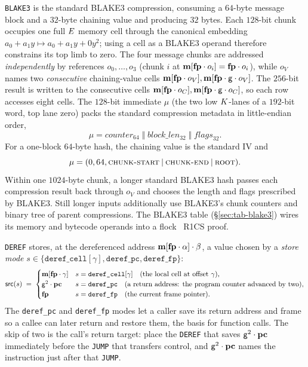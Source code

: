 \texttt{BLAKE3} is the standard BLAKE3 compression, consuming a $64$-byte message block and a $32$-byte chaining value and producing $32$ bytes. Each $128$-bit chunk occupies one full $E$ memory cell through the canonical embedding $a_0+a_1y\mapsto a_0+a_1y+0y^2$; using a cell as a BLAKE3 operand therefore constrains its top limb to zero. The four message chunks are addressed \emph{independently} by references $o_0,\dots,o_3$ (chunk $i$ at $\mathbf{m}[\mathbf{fp}\cdot o_i]=\mathbf{fp}\cdot o_i$), while $o_V$ names two \emph{consecutive} chaining-value cells $\mathbf{m}[\mathbf{fp}\cdot o_V],\mathbf{m}[\mathbf{fp}\cdot \mathsf{g}\cdot o_V]$. The $256$-bit result is written to the consecutive cells $\mathbf{m}[\mathbf{fp}\cdot o_C],\mathbf{m}[\mathbf{fp}\cdot \mathsf{g}\cdot o_C]$, so each row accesses eight cells. The $128$-bit immediate $\mu$ (the two low $K$-lanes of a $192$-bit word, top lane zero) packs the standard compression metadata in little-endian order,
\[
  \mu=\mathit{counter}_{64}\;\Vert\;\mathit{block\_len}_{32}\;\Vert\;\mathit{flags}_{32}.
\]
For a one-block $64$-byte hash, the chaining value is the standard IV and
\[
  \mu=(0,64,\textsc{chunk-start}\mathbin{|}\textsc{chunk-end}\mathbin{|}\textsc{root}).
\]
Within one $1024$-byte chunk, a longer standard BLAKE3 hash passes each compression result back through $o_V$ and chooses the length and flags prescribed by BLAKE3. Still longer inputs additionally use BLAKE3's chunk counters and binary tree of parent compressions. The BLAKE3 table (\S\ref{sec:tab-blake3}) wires its memory and bytecode operands into a flock~\cite{flock-impl} R1CS proof.

\texttt{DEREF} stores, at the dereferenced address $\mathbf{m}[\mathbf{fp}\cdot \alpha]\cdot\beta$, a value chosen by a \emph{store mode} $s\in\{\texttt{deref\_cell}[\gamma],\texttt{deref\_pc},\texttt{deref\_fp}\}$:
\[
  \mathsf{src}(s)\;=\;
  \begin{cases}
    \mathbf{m}[\mathbf{fp}\cdot \gamma] & s=\texttt{deref\_cell}[\gamma] \quad(\text{the local cell at offset }\gamma),\\
    \mathsf{g}^{2}\cdot\mathbf{pc} & s=\texttt{deref\_pc} \quad(\text{a return address: the program counter advanced by two}),\\
    \mathbf{fp} & s=\texttt{deref\_fp} \quad(\text{the current frame pointer}).
  \end{cases}
\]
The \texttt{deref\_pc} and \texttt{deref\_fp} modes let a caller save its return address and frame so a callee can later return and restore them, the basis for function calls. The skip of two is the call's return target: place the \texttt{DEREF} that saves $\mathsf{g}^{2}\cdot\mathbf{pc}$ immediately before the \texttt{JUMP} that transfers control, and $\mathsf{g}^{2}\cdot\mathbf{pc}$ names the instruction just after that \texttt{JUMP}.

